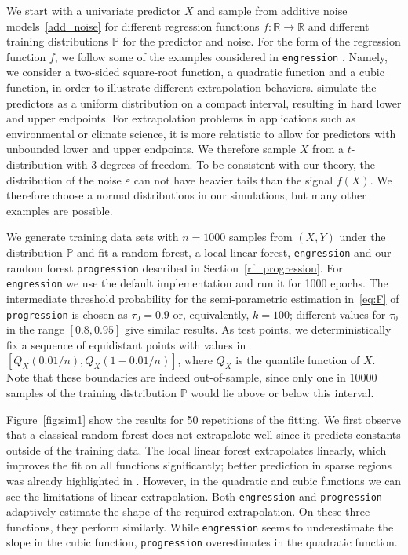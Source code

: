 \documentclass{statsoc}
\theoremstyle{break}
\newcommand{\Ptr}{\mathbb P}
\newcommand{\tauzero}{\tau_0}
\begin{document}
We start with a univariate predictor $X$ and sample from additive noise models~\eqref{add_noise} for different regression functions $f: \mathbb R \to \mathbb R$ and different training distributions $\Ptr$ for the predictor and noise. For the form of the regression function $f$, we follow some of the examples considered in \texttt{engression} \citep{shen:meinshausen:2023}. Namely, we consider a two-sided square-root function, a quadratic function and a cubic function, in order to illustrate different extrapolation behaviors.
\citep{shen:meinshausen:2023} simulate the predictors as a uniform distribution on a compact interval, resulting in hard lower and upper endpoints. For extrapolation problems in applications such as environmental or climate science, it is more relatistic to allow for predictors with unbounded lower and upper endpoints. We therefore sample $X$ from a $t$-distribution with $3$ degrees of freedom. To be consistent with our theory, the distribution of the noise $\varepsilon$ can not have heavier tails than the signal $f(X)$. We therefore choose a normal distributions in our simulations, but many other examples are possible.

We generate training data sets with $n=1000$ samples from $(X,Y)$ under the distribution $\Ptr$ and fit a random forest, a local linear forest, \texttt{engression} and our random forest \texttt{progression} described in Section~\ref{rf_progression}. 
For \texttt{engression} we use the default implementation and run it for 1000 epochs. The intermediate threshold probability for the semi-parametric estimation in~\eqref{eq:F} of \texttt{progression} is chosen as $\tauzero = 0.9$ or, equivalently, $k=100$; different values for $\tauzero$ in the range $[0.8,0.95]$ give similar results.
As test points, we deterministically fix a sequence of equidistant points with values in $[Q_X(0.01/n),Q_X(1-0.01/n)]$, where $Q_X$ is the quantile function of $X$.
Note that these boundaries are indeed out-of-sample, since only one in 10000 samples of the training distribution $\Ptr$ would lie above or below this interval.

Figure~\ref{fig:sim1} show the results for 50 repetitions of the fitting. We first observe that a classical random forest does not extrapalote well since it predicts constants outside of the training data. The local linear forest extrapolates linearly, which improves the fit on all functions significantly; better prediction in sparse regions was already highlighted in \cite{friedberg:tibshirani:wager:2021}. However, in the quadratic and cubic functions we can see the limitations of linear extrapolation. Both \texttt{engression} and \texttt{progression} adaptively estimate the shape of the required extrapolation. On these three functions, they perform similarly. While \texttt{engression} seems to underestimate the slope in the cubic function, \texttt{progression} overestimates in the quadratic function.
\end{document}
